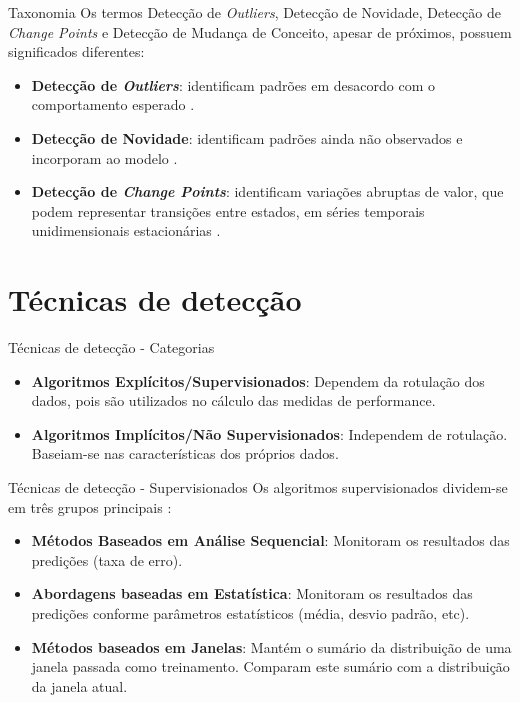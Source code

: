 \documentclass[10pt]{beamer}
\begin{document}
\begin{frame}{Taxonomia}
    Os termos Detecção de \textit{Outliers}, Detecção de Novidade, Detecção de \textit{Change Points} e Detecção de Mudança de Conceito, apesar de próximos, possuem significados diferentes:

    \begin{itemize}
        \item \textbf{Detecção de \textit{Outliers}}: identificam padrões em desacordo com o comportamento esperado \cite{Chandola:2009:ADS:1541880.1541882}.
        \item \textbf{Detecção de Novidade}: identificam padrões ainda não observados e incorporam ao modelo \cite{Chandola:2009:ADS:1541880.1541882}.
        \item \textbf{Detecção de \textit{Change Points}}: identificam variações abruptas de valor, que podem representar transições entre estados, em séries temporais unidimensionais estacionárias \cite{Aminikhanghahi:2017:SMT:3086013.3086037}.
    \end{itemize}
\end{frame}

\section{Técnicas de detecção}

\begin{frame}{Técnicas de detecção - Categorias}
    \begin{itemize}
        \item \textbf{Algoritmos Explícitos/Supervisionados}: Dependem da rotulação dos dados, pois são utilizados no cálculo das medidas de performance.
        \item \textbf{Algoritmos Implícitos/Não Supervisionados}: Independem de rotulação. Baseiam-se nas características dos próprios dados. 
    \end{itemize}
\end{frame}

\begin{frame}{Técnicas de detecção - Supervisionados}
    Os algoritmos supervisionados dividem-se em três grupos principais \cite{Gama:2014:SCD:2597757.2523813}:

    \begin{itemize}
        \item \textbf{Métodos Baseados em Análise Sequencial}: Monitoram os resultados das predições (taxa de erro).
        \item \textbf{Abordagens baseadas em Estatística}: Monitoram os resultados das predições conforme parâmetros estatísticos (média, desvio padrão, etc).
        \item \textbf{Métodos baseados em Janelas}: Mantém o sumário da distribuição de uma janela passada como treinamento. Comparam este sumário com a distribuição da janela atual.
    \end{itemize}
\end{frame}
\end{document}
